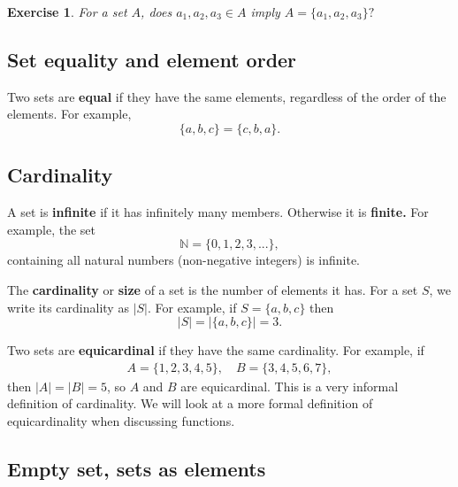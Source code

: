 \documentclass{article}[12pt]
\newtheorem{exercise}{Exercise}
\newcommand{\N}{\mathbb{N}}
\begin{document}
        \begin{exercise}
            For a set $A$, does $a_1, a_2, a_3 \in A$ imply $A = \{a_1, a_2, a_3\}?$
        \end{exercise}
        
        
    \subsection{Set equality and element order}
        
        Two sets are \textbf{equal} if they have the same elements, regardless of the order of the elements. For example,
        \begin{equation}
            \{a, b, c\} = \{c, b, a\}.
        \end{equation}
        
    \subsection{Cardinality}
        
        A set is \textbf{infinite} if it has infinitely many members. Otherwise it is \textbf{finite.} For example, the set
        \begin{equation}
            \N = \{0, 1, 2, 3, ...\}, \label{naturals}
        \end{equation}
        containing all natural numbers (non-negative integers) is infinite.
        
        The \textbf{cardinality} or \textbf{size} of a set is the number of elements it has. For a set $S$, we write its cardinality as $|S|.$ For example, if $S = \{a, b, c\}$ then
        \begin{equation}
            |S| = |\{a, b, c\}| = 3.
        \end{equation}
        
        Two sets are \textbf{equicardinal} if they have the same cardinality. For example, if
        \begin{align}
            A = \{1, 2, 3, 4, 5\}, \quad B = \{3, 4, 5, 6, 7\},
        \end{align}
        then $|A| = |B| = 5$, so $A$ and $B$ are equicardinal. This is a very informal definition of cardinality. We will look at a more formal definition of equicardinality when discussing functions.
        
    \subsection{Empty set, sets as elements}
    
\end{document}
